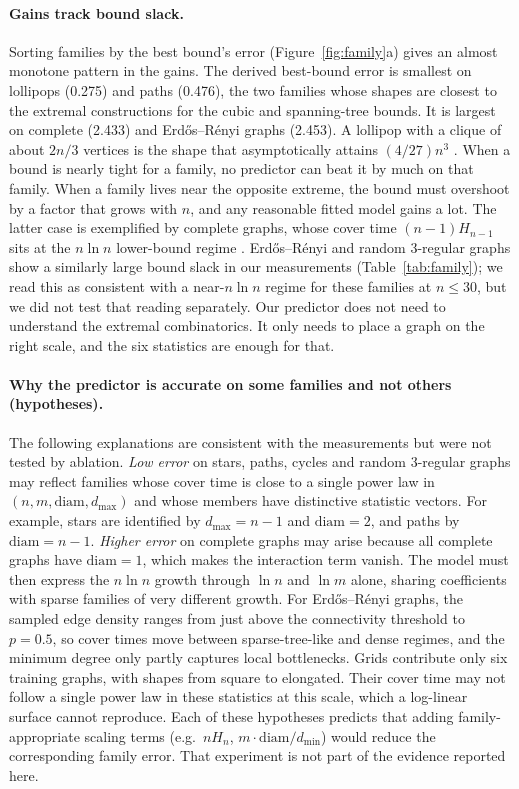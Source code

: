 \documentclass{article}
\newcommand{\diam}{\mathrm{diam}}
\begin{document}
\paragraph{Gains track bound slack.}
Sorting families by the best bound's error (Figure~\ref{fig:family}a) gives an almost monotone pattern in the gains. The derived best-bound error is smallest on lollipops (0.275) and paths (0.476), the two families whose shapes are closest to the extremal constructions for the cubic and spanning-tree bounds. It is largest on complete (2.433) and Erd\H{o}s--R\'enyi graphs (2.453). %
A lollipop with a clique of about $2n/3$ vertices is the shape that asymptotically attains $(4/27)n^3$ \citep{Lovász2001RandomWO}. When a bound is nearly tight for a family, no predictor can beat it by much on that family. When a family lives near the opposite extreme, the bound must overshoot by a factor that grows with $n$, and any reasonable fitted model gains a lot. The latter case is exemplified by complete graphs, whose cover time $(n-1)H_{n-1}$ sits at the $n\ln n$ lower-bound regime \citep{Lovász2001RandomWO,Feige1995ATL}. Erd\H{o}s--R\'enyi and random 3-regular graphs show a similarly large bound slack in our measurements (Table~\ref{tab:family}); we read this as consistent with a near-$n\ln n$ regime for these families at $n\le 30$, but we did not test that reading separately. Our predictor does not need to understand the extremal combinatorics. It only needs to place a graph on the right scale, and the six statistics are enough for that.

\paragraph{Why the predictor is accurate on some families and not others (hypotheses).}
The following explanations are consistent with the measurements but were not tested by ablation. \emph{Low error} on stars, paths, cycles and random 3-regular graphs may reflect families whose cover time is close to a single power law in $(n,m,\diam,d_{\max})$ and whose members have distinctive statistic vectors. For example, stars are identified by $d_{\max}=n-1$ and $\diam=2$, and paths by $\diam=n-1$. \emph{Higher error} on complete graphs may arise because all complete graphs have $\diam=1$, which makes the interaction term vanish. The model must then express the $n\ln n$ growth through $\ln n$ and $\ln m$ alone, sharing coefficients with sparse families of very different growth. For Erd\H{o}s--R\'enyi graphs, the sampled edge density ranges from just above the connectivity threshold to $p=0.5$, so cover times move between sparse-tree-like and dense regimes, and the minimum degree only partly captures local bottlenecks. Grids contribute only six training graphs, with shapes from square to elongated. Their cover time may not follow a single power law in these statistics at this scale, which a log-linear surface cannot reproduce. Each of these hypotheses predicts that adding family-appropriate scaling terms (e.g.\ $n H_n$, $m\cdot\diam/d_{\min}$) would reduce the corresponding family error. That experiment is not part of the evidence reported here.
\end{document}
